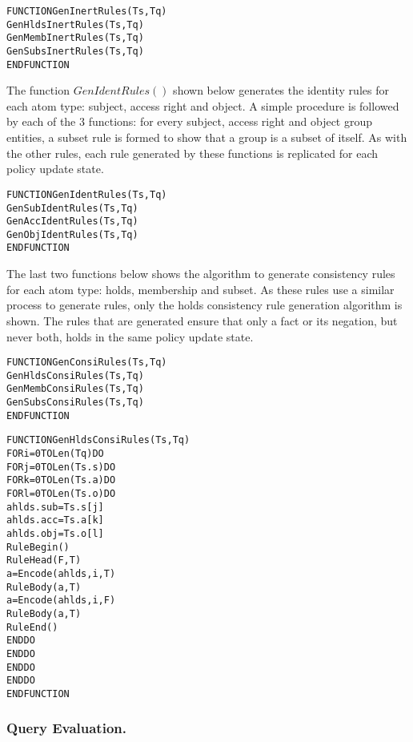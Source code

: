 \documentclass[global,twocolumn,final]{svjour}
\newenvironment{vverbatim}
  {\begin{alltt}}
  {\vspace{-\baselineskip}\end{alltt}}
\begin{document}
          \begin{vverbatim}
FUNCTION GenInertRules(Ts, Tq)
  GenHldsInertRules(Ts, Tq)
  GenMembInertRules(Ts, Tq)
  GenSubsInertRules(Ts, Tq)
ENDFUNCTION
          \end{vverbatim}

          The function $GenIdentRules()$ shown below generates the identity
          rules for each atom type: subject, access right and object. A simple
          procedure is followed by each of the 3 functions: for every subject,
          access right and object group entities, a subset rule is formed to
          show that a group is a subset of itself. As with the other rules,
          each rule generated by these functions is replicated for each policy
          update state.

          \begin{vverbatim}
FUNCTION GenIdentRules(Ts, Tq)
  GenSubIdentRules(Ts, Tq)
  GenAccIdentRules(Ts, Tq)
  GenObjIdentRules(Ts, Tq)
ENDFUNCTION
          \end{vverbatim}

          The last two functions below shows the algorithm to generate
          consistency rules for each atom type: holds, membership and subset.
          As these rules use a similar process to generate rules, only the
          holds consistency rule generation algorithm is shown. The rules that
          are generated ensure that only a fact or its negation, but never
          both, holds in the same policy update state.

          \begin{vverbatim}
FUNCTION GenConsiRules(Ts, Tq)
  GenHldsConsiRules(Ts, Tq)
  GenMembConsiRules(Ts, Tq)
  GenSubsConsiRules(Ts, Tq)
ENDFUNCTION
          \end{vverbatim}

          \begin{vverbatim}
FUNCTION GenHldsConsiRules(Ts, Tq)
  FOR i = 0 TO Len(Tq) DO
    FOR j = 0 TO Len(Ts.s) DO
      FOR k = 0 TO Len(Ts.a) DO
        FOR l = 0 TO Len(Ts.o) DO
          ahlds.sub = Ts.s[j]
          ahlds.acc = Ts.a[k]
          ahlds.obj = Ts.o[l]
          RuleBegin()
          RuleHead(F, T)
          a = Encode(ahlds, i, T)
          RuleBody(a, T)
          a = Encode(ahlds, i, F)
          RuleBody(a, T)
          RuleEnd()
        ENDDO
      ENDDO
    ENDDO
  ENDDO
ENDFUNCTION
          \end{vverbatim}

      \subsubsection{Query Evaluation.}
\end{document}
